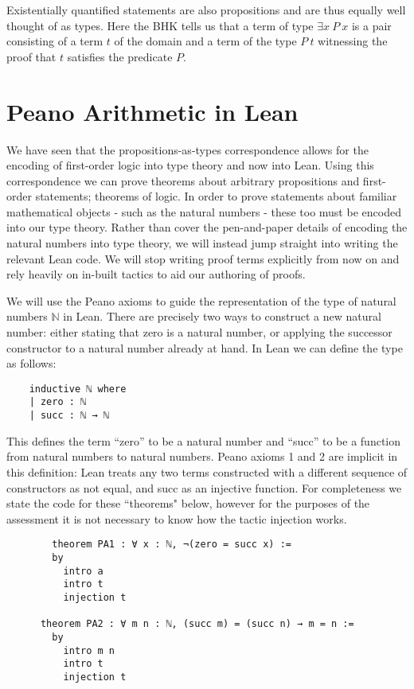\documentclass{book}
\begin{document}
Existentially quantified statements are also propositions and are thus equally well thought of as types. Here the BHK tells us that a term of type $\exists x \ P \ x$ is a pair consisting of a term $t$ of the domain and a term of the type $P \ t$ witnessing the proof that $t$ satisfies the predicate $P$. 

\newpage
\section{Peano Arithmetic in Lean}

We have seen that the propositions-as-types correspondence allows for the encoding of first-order logic into type theory and now into Lean. Using this correspondence we can prove theorems about arbitrary propositions and first-order statements; theorems of logic. In order to prove statements about familiar mathematical objects - such as the natural numbers - these too must be encoded into our type theory. Rather than cover the pen-and-paper details of encoding the natural numbers into type theory, we will instead jump straight into writing the relevant Lean code. We will stop writing proof terms explicitly from now on and rely heavily on in-built tactics to aid our authoring of proofs. 

We will use the Peano axioms to guide the representation of the type of natural numbers $\mathbb{N}$ in Lean. There are precisely two ways to construct a new natural number: either stating that zero is a natural number, or applying the successor constructor to a natural number already at hand. In Lean we can define the type as follows: 

\begin{center}
    \begin{lstlisting}
    inductive ℕ where
    | zero : ℕ
    | succ : ℕ → ℕ
    \end{lstlisting}
\end{center}

This defines the term ``zero'' to be a natural number and ``succ'' to be a function from natural numbers to natural numbers. Peano axioms 1 and 2 are implicit in this definition: Lean treats any two terms constructed with a different sequence of constructors as not equal, and succ as an injective function. For completeness we state the code for these ``theorems" below, however for the purposes of the assessment it is not necessary to know how the tactic injection works.

\begin{center}
    \begin{lstlisting}
        theorem PA1 : ∀ x : ℕ, ¬(zero = succ x) :=
        by
          intro a
          intro t
          injection t
      
      theorem PA2 : ∀ m n : ℕ, (succ m) = (succ n) → m = n :=
        by
          intro m n
          intro t
          injection t
    \end{lstlisting}
\end{center}
\end{document}

